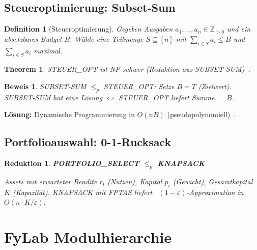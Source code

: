 \documentclass[a4paper,12pt]{article}
\newtheorem{definition}{Definition}
\newtheorem{theorem}{Theorem}
\newtheorem*{beweis*}{Beweis}
\newtheorem{reduktion}{Reduktion}
\begin{document}
\subsection{Steueroptimierung: Subset-Sum}

\begin{definition}[Steueroptimierung]
    Gegeben Ausgaben $a_1, \ldots, a_n \in \mathbb{Z}_{>0}$ und ein
    absetzbares Budget $B$. Wähle eine Teilmenge $S \subseteq [n]$ mit
    $\sum_{i \in S} a_i \leq B$ und $\sum_{i \in S} a_i$ maximal.
\end{definition}

\begin{theorem}
    STEUER\_OPT ist NP-schwer (Reduktion aus SUBSET-SUM)~\cite{garey1979}.
\end{theorem}

\begin{beweis*}
    SUBSET-SUM $\leq_p$ STEUER\_OPT: Setze $B = T$ (Zielwert).
    SUBSET-SUM hat eine Lösung $\Leftrightarrow$ STEUER\_OPT liefert
    Summe $= B$.
\end{beweis*}

\textbf{Lösung:} Dynamische Programmierung in $O(nB)$ (pseudopolynomiell)~\cite{cormen2022}.

\subsection{Portfolioauswahl: 0-1-Rucksack}

\begin{reduktion}
    \textbf{PORTFOLIO\_SELECT $\leq_p$ KNAPSACK}

    Assets mit erwarteter Rendite $r_i$ (Nutzen), Kapital $p_i$ (Gewicht),
    Gesamtkapital $K$ (Kapazität). KNAPSACK mit FPTAS liefert~\cite{garey1979}
    $(1-\varepsilon)$-Approximation in $O(n \cdot K / \varepsilon)$.
\end{reduktion}

\section{FyLab Modulhierarchie}
\label{sec:architektur}
\end{document}
